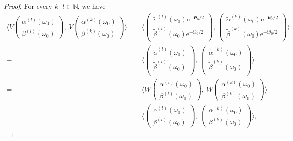 \documentclass[pdflatex,sn-mathphys-num]{sn-jnl}%
\theoremstyle{thmstyleone}%
\theoremstyle{thmstyletwo}%
\theoremstyle{thmstylethree}%
\theoremstyle{definition}
\theoremstyle{remark}
\begin{document}
\begin{proof}
  For every $k,\ l\in\mathbb{N}$, we have
     \begin{equation*}
 	\begin{aligned}
 		\langle V
 		\begin{pmatrix}
 			\alpha^{(l)}(\omega_0) \\
 			\beta^{(l)}(\omega_0)
 		\end{pmatrix},\
 		V
 		\begin{pmatrix}
 			\alpha^{(k)}(\omega_0) \\
 			\beta^{(k)}(\omega_0)
 		\end{pmatrix}
 		\rangle
 		= & \langle
 		\begin{pmatrix}
 			\widetilde{\alpha}^{(l)}(\omega_0)\mathrm{e}^{-\boldsymbol{i}\theta_0/2} \\
 			\widetilde{\beta}^{(l)}(\omega_0)\mathrm{e}^{-\boldsymbol{i}\theta_0/2} \\
 		\end{pmatrix},\
 		\begin{pmatrix}
 			\widetilde{\alpha}^{(k)}(\omega_0)\mathrm{e}^{-\boldsymbol{i}\theta_0/2} \\
 			\widetilde{\beta}^{(k)}(\omega_0)\mathrm{e}^{-\boldsymbol{i}\theta_0/2} \\
 		\end{pmatrix}
 		\rangle \\
 		= &
 		\langle
 		\begin{pmatrix}
 			\widetilde{\alpha}^{(l)}(\omega_0) \\
 			\widetilde{\beta}^{(l)}(\omega_0)\\
 		\end{pmatrix},\
 		\begin{pmatrix}
 			\widetilde{\alpha}^{(k)}(\omega_0) \\
 			\widetilde{\beta}^{(k)}(\omega_0) \\
 		\end{pmatrix}
 		\rangle \\
 		= & \langle
 		W\begin{pmatrix}
 			\alpha^{(l)}(\omega_0) \\
 			\beta^{(l)}(\omega_0)
 		\end{pmatrix},\
 		W\begin{pmatrix}
 			\alpha^{(k)}(\omega_0) \\
 			\beta^{(k)}(\omega_0)
 		\end{pmatrix}
 		\rangle \\
 		= & \langle
 		\begin{pmatrix}
 			\alpha^{(l)}(\omega_0) \\
 			\beta^{(l)}(\omega_0)
 		\end{pmatrix},\
 		\begin{pmatrix}
 			\alpha^{(k)}(\omega_0) \\
 			\beta^{(k)}(\omega_0)
 		\end{pmatrix}
 		\rangle,
 	\end{aligned}
 \end{equation*}


\end{proof}
\end{document}
